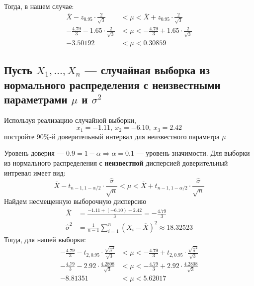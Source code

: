 \documentclass{article}
\begin{document}
Тогда, в нашем случае:
\begin{equation*}
    \begin{aligned}
        \overline{X}-z_{0.95}\cdot\frac{2}{\sqrt{3}}&<\mu<\overline{X}+z_{0.95}\cdot\frac{2}{\sqrt{3}}\\
        -\frac{4.79}{3}-1.65\cdot\frac{2}{\sqrt{3}}&<\mu<-\frac{4.79}{3}+1.65\cdot\frac{2}{\sqrt{3}}\\
        -3.50192&<\mu<0.30859
    \end{aligned}
\end{equation*}

\subsection{Пусть $X_{1}, \ldots, X_{n}$ — случайная выборка из нормального распределения с неизвестными параметрами $\mu$ и $\sigma^{2}$}
Используя реализацию случайной выборки,
\begin{equation*}
    x_{1}=-1.11,\ x_{2}=-6.10,\ x_{3}=2.42
\end{equation*}
постройте $90 \%$-й доверительный интервал для неизвестного параметра $\mu$

Уровень доверия — $0.9=1-\alpha\Longrightarrow\alpha=0.1$ — уровень значимости. Для выборки из нормального распределения с \textbf{неизвестной} дисперсией доверительный интревал имеет вид:
\begin{equation*}
    \overline{X}-t_{n-1,1-\alpha/2}\cdot\frac{\widehat{\sigma}}{\sqrt{n}}<\mu<\overline{X}+t_{n-1,1-\alpha/2}\cdot\frac{\widehat{\sigma}}{\sqrt{n}}
\end{equation*}
Найдем несмещенную выборочную дисперсию
\begin{equation*}
    \begin{aligned}
        \overline{X}&=\displaystyle\frac{-1.11+(-6.10)+2.42}{3}=-\frac{4.79}{3}\\
        \widehat{\sigma}^2&=\frac{1}{n-1}\sum_{i=1}^n\left(X_i-\overline{X}\right)^2\approx18.32523
    \end{aligned}
\end{equation*}
Тогда, для нашей выборки:
\begin{equation*}
    \begin{aligned}
        -\frac{4.79}{3}-t_{2,0.95}\cdot\frac{\sqrt{\widehat{\sigma}^2}}{\sqrt{3}}&<\mu<-\frac{4.79}{3}+t_{2,0.95}\cdot\frac{\sqrt{\widehat{\sigma}^2}}{\sqrt{3}}\\
        -\frac{4.79}{3}-2.92\cdot\frac{4.2808}{\sqrt{3}}&<\mu<-\frac{4.79}{3}+2.92\cdot\frac{4.2808}{\sqrt{3}}\\
        -8.81351&<\mu<5.62017
    \end{aligned}
\end{equation*}
\end{document}
